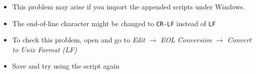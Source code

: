 \begin{description}[leftmargin=\parindent,labelindent=\parindent,style=nextline]
  \begin{itemize}[noitemsep]
  \item This problem may arise if you import the appended scripts under Windows.
  \item The end-of-line character might be changed to \texttt{CR-LF} instead of \texttt{LF}
  \item To check this problem, open  and go to \textit{Edit} $\rightarrow$ \textit{EOL Conversion} $\rightarrow$ \textit{Convert to Unix Format (LF)}
  \item Save and try using the script again
  \end{itemize}
\end{description}